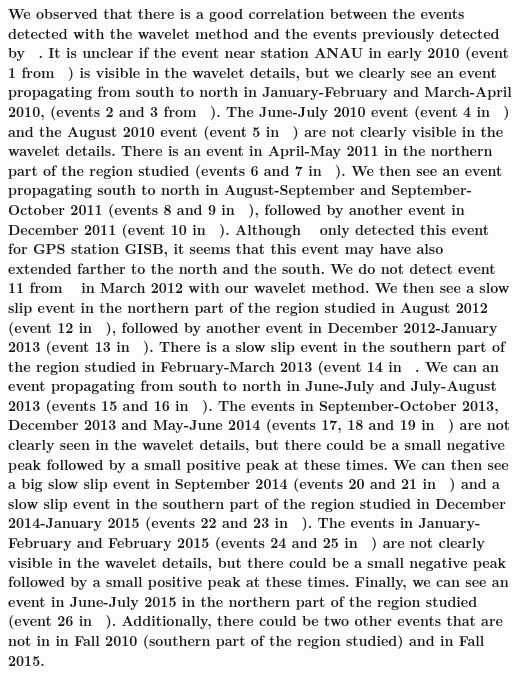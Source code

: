 \documentclass{article}
\begin{document}
\textbf{We observed that there is a good correlation between the events detected with the wavelet method and the events previously detected by ~\citet{TOD_2016}. It is unclear if the event near station ANAU in early 2010 (event 1 from ~\citet{TOD_2016}) is visible in the wavelet details, but we clearly see an event propagating from south to north in January-February and March-April 2010, (events 2 and 3 from ~\citet{TOD_2016}). The June-July 2010 event (event 4 in ~\citet{TOD_2016}) and the August 2010 event (event 5 in ~\citet{TOD_2016}) are not clearly visible in the wavelet details. There is an event in April-May 2011 in the northern part of the region studied (events 6 and 7 in ~\citet{TOD_2016}). We then see an event propagating south to north in August-September and September-October 2011 (events 8 and 9 in ~\citet{TOD_2016}), followed by another event in December 2011 (event 10 in ~\citet{TOD_2016}). Although ~\citep{TOD_2016} only detected this event for GPS station GISB, it seems that this event may have also extended farther to the north and the south. We do not detect event 11 from ~\citet{TOD_2016} in March 2012 with our wavelet method. We then see a slow slip event in the northern part of the region studied in August 2012 (event 12 in ~\citet{TOD_2016}), followed by another event in December 2012-January 2013 (event 13 in ~\citet{TOD_2016}). There is a slow slip event in the southern part of the region studied in February-March 2013 (event 14 in ~\citet{TOD_2016}. We can an event propagating from south to north in June-July and July-August 2013 (events 15 and 16 in ~\citet{TOD_2016}). The events in September-October 2013, December 2013 and May-June 2014 (events 17, 18 and 19 in ~\citet{TOD_2016}) are not clearly seen in the wavelet details, but there could be a small negative peak followed by a small positive peak at these times. We can then see a big slow slip event in September 2014 (events 20 and 21 in ~\citet{TOD_2016}) and a slow slip event in the southern part of the region studied in December 2014-January 2015 (events 22 and 23 in ~\citet{TOD_2016}). The events in January-February and February 2015 (events 24 and 25 in ~\citet{TOD_2016}) are not clearly visible in the wavelet details, but there could be a small negative peak followed by a small positive peak at these times. Finally, we can see an event in June-July 2015 in the northern part of the region studied (event 26 in ~\citet{TOD_2016}). Additionally, there could be two other events that are not in \citep{TOD_2016} in Fall 2010 (southern part of the region studied) and in Fall 2015.} \\
\end{document}
